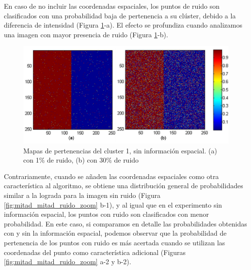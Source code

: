 En caso de no incluir las coordenadas espaciales, los puntos de ruido son clasificados con una probabilidad baja de pertenencia a su clúster, debido a la diferencia de intensidad (Figura \ref{fig:ruido_1y30}-a). El efecto se profundiza cuando analizamos una imagen con mayor presencia de ruido (Figura \ref{fig:ruido_1y30}-b).


\begin{figure}[H]
\centering
\includegraphics[scale=0.055]{images/mitad_mitad__ruido_1y_30.jpg}
\caption{Mapas de pertenencias del cluster 1, sin información espacial. (a) con 1\% de ruido, (b) con 30\% de ruido
}
\label{fig:ruido_1y30}
\end{figure}

Contrariamente, cuando se añaden las coordenadas espaciales como otra característica al algoritmo, se obtiene una distribución general de probabilidades similar a la lograda para la imagen sin ruido (Figura \ref{fig:mitad_mitad_ruido_zoom} b-1), y al igual que en el experimento sin información espacial, los puntos con ruido son clasificados con menor probabilidad. 
En este caso, si comparamos en detalle las probabilidades obtenidas con y sin la información espacial, podemos observar que la probabilidad de pertenencia de los  puntos con ruido es más acertada cuando se utilizan las coordenadas del punto como característica adicional (Figuras \ref{fig:mitad_mitad_ruido_zoom} a-2 y b-2).


